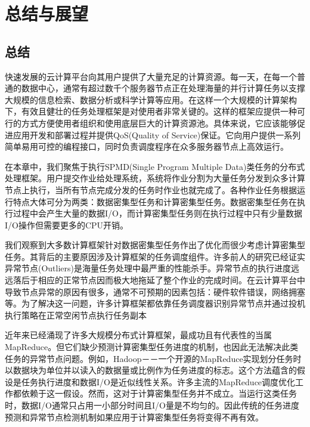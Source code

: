 \chapter{总结与展望}
\label{cha:conclusion_futruework}

\section{总结}
\label{sec:conclusion}
快速发展的云计算平台向其用户提供了大量充足的计算资源。每一天，在每一个普通的数据中心，通常有超过数千个服务器节点正在处理海量的并行计算任务以支撑大规模的信息检索、数据分析或科学计算等应用。在这样一个大规模的计算架构下，有效且健壮的任务处理框架是对使用者非常关键的。这样的框架应提供一种可行的方式方便使用者组织和使用底层巨大的计算资源池。具体来说，它应该能够促进应用开发和部署过程并提供QoS(Quality of Service)保证。它向用户提供一系列简单易用可控的编程接口，同时负责调度程序在众多服务器节点上高效运行。

在本章中，我们聚焦于执行SPMD(Single Program Multiple Data)类任务的分布式处理框架。用户提交作业给处理系统，系统将作业分割为大量任务分发到众多计算节点上执行，当所有节点完成分发的任务时作业也就完成了。各种作业任务根据运行特点大体可分为两类：数据密集型任务和计算密集型任务。数据密集型任务在执行过程中会产生大量的数据I/O，而计算密集型任务则在执行过程中只有少量数据I/O操作但需要更多的CPU开销。

我们观察到大多数计算框架针对数据密集型任务作出了优化而很少考虑计算密集型任务。其背后的主要原因涉及计算框架的任务调度组件。许多前人的研究\cite{Zaharia:2008:IMP:1855741.1855744, Ananthanarayanan:2010:ROM:1924943.1924962}已经证实异常节点(Outliers)是海量任务处理中最严重的性能杀手。异常节点的执行进度远远落后于相应的正常节点因而极大地拖延了整个作业的完成时间。在云计算平台中导致节点异常的原因有很多，通常不可预期的因素包括：硬件软件错误，网络拥塞等。为了解决这一问题，许多计算框架都依靠任务调度器识别异常节点并通过投机执行策略在正常空闲节点执行任务副本

近年来已经涌现了许多大规模分布式计算框架，最成功且有代表性的当属MapReduce。但它们缺少预测计算密集型任务进度的机制，也因此无法解决此类任务的异常节点问题。例如，Hadoop－－一个开源的MapReduce实现划分任务时以数据块为单位并以读入的数据量或比例作为任务进度的标志。这个方法蕴含的假设是任务执行进度和数据I/O是近似线性关系。许多主流的MapReduce调度优化工作都依赖于这一假设。然而，这对于计算密集型任务并不成立。当运行这类任务时，数据I/O通常只占用一小部分时间且I/O量是不均匀的。因此传统的任务进度预测和异常节点检测机制如果应用于计算密集型任务将变得不再有效。


